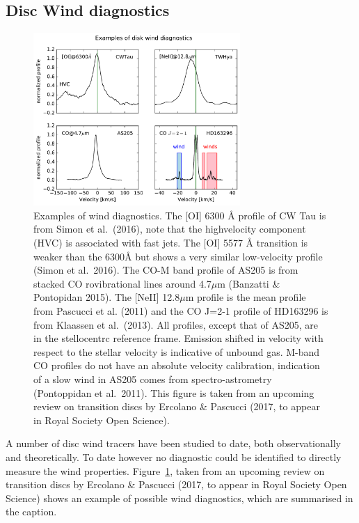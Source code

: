 \documentclass[10pt,fleqn,twoside]{article}
\begin{document}
\subsection{Disc Wind diagnostics}
 \begin{figure}
   \centering
   \includegraphics[width=0.7\textwidth]{winds.pdf}

   \caption{Examples of wind diagnostics. The [OI] 6300 Å profile of CW Tau is from Simon et al.\ (2016), note that the highvelocity
component (HVC) is associated with fast jets. The [OI] 5577 Å transition is weaker than the 6300Å but shows a
very similar low-velocity profile (Simon et al.\ 2016). The CO-M band profile of AS205 is from stacked CO rovibrational
lines around 4.7$\mu$m (Banzatti \& Pontopidan 2015). The [NeII] 12.8$\mu$m profile is the mean profile from Pascucci et al.
(2011) and the CO J=2-1 profile of HD163296 is from Klaassen et al.\ (2013). All profiles, except that of AS205, are in
the stellocentrc reference frame. Emission shifted in velocity with respect to the stellar velocity is indicative of unbound
gas. M-band CO profiles do not have an absolute velocity calibration, indication of a slow wind in AS205 comes from
spectro-astrometry (Pontoppidan et al.\ 2011). This figure is
taken from an upcoming review on transition discs by Ercolano \& Pascucci (2017, to appear in Royal
Society Open Science).}
              \label{fig:lines}%
    \end{figure}

A number of disc wind tracers have been studied to date, both
observationally and theoretically. To date however no diagnostic could
be identified to directly measure the wind properties. 
Figure~\ref{fig:lines}, taken from an upcoming review on transition discs by
Ercolano \& Pascucci (2017, to appear in Royal Society Open Science)
shows an example of possible wind diagnostics, which are summarised in
the caption.  
\end{document}

